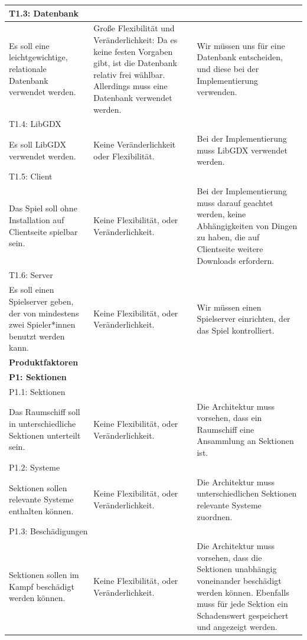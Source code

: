 \documentclass[fontsize=12pt,paper=a4,twoside]{scrartcl}
\begin{document}
\begin{longtable}[c]{|p{5cm}|p{5cm}|p{5cm}|}
\multicolumn{3}{|l|}{{T1.3: Datenbank}} 
\\ \hline
Es soll eine leichtgewichtige, relationale Datenbank verwendet werden. & Große Flexibilität und Veränderlichkeit: Da es keine festen Vorgaben gibt, ist die Datenbank relativ frei wählbar. Allerdings muss eine Datenbank verwendet werden. & Wir müssen uns für eine Datenbank entscheiden, und diese bei der Implementierung verwenden. 
\\ \hline
\multicolumn{3}{|l|}{{T1.4: LibGDX}} 
\\ \hline
Es soll LibGDX verwendet werden. & Keine Veränderlichkeit oder Flexibilität.   & Bei der Implementierung muss LibGDX verwendet werden. 
\\ \hline
\multicolumn{3}{|l|}{{T1.5: Client}} 
\\ \hline
Das Spiel soll ohne Installation auf Clientseite spielbar sein. & Keine Flexibilität, oder Veränderlichkeit.    &  Bei der Implementierung muss darauf geachtet werden, keine Abhängigkeiten von Dingen zu haben, die auf Clientseite weitere Downloads erfordern. 
\\ \hline
\multicolumn{3}{|l|}{{T1.6: Server}} 
\\ \hline
Es soll einen Spielserver geben, der von mindestens zwei Spieler*innen benutzt werden kann. & Keine Flexibilität, oder Veränderlichkeit.    & Wir müssen einen Spielserver einrichten, der das Spiel kontrolliert. 
\\ \hline
\multicolumn{3}{|l|}{{\textbf{Produktfaktoren}}} 
\\ \hline
%
\multicolumn{3}{|l|}{{\textbf{P1: Sektionen}}} 
\\ \hline
\multicolumn{3}{|l|}{{P1.1: Sektionen}} 
\\ \hline
Das Raumschiff soll in unterschiedliche Sektionen unterteilt sein. & Keine Flexibilität, oder Veränderlichkeit.    & Die Architektur muss vorsehen, dass ein Raumschiff eine Ansammlung an Sektionen ist. 
\\ \hline 
\multicolumn{3}{|l|}{{P1.2: Systeme}} 
\\ \hline
Sektionen sollen relevante Systeme enthalten können.  & Keine Flexibilität, oder Veränderlichkeit.    & Die Architektur muss unterschiedlichen Sektionen relevante Systeme zuordnen. 
\\ \hline
\multicolumn{3}{|l|}{{P1.3: Beschädigungen}} 
\\ \hline
Sektionen sollen im Kampf beschädigt werden können.  & Keine Flexibilität, oder Veränderlichkeit.    & Die Architektur muss vorsehen, dass die Sektionen unabhängig voneinander beschädigt werden können. Ebenfalls muss für jede Sektion ein Schadenswert gespeichert und angezeigt werden. 

\end{longtable}
\end{document}

